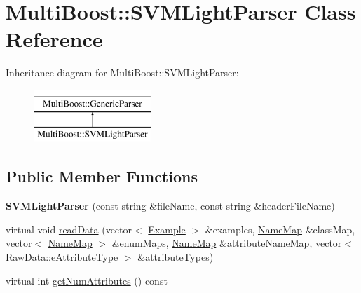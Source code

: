 \hypertarget{classMultiBoost_1_1SVMLightParser}{\section{Multi\-Boost\-:\-:S\-V\-M\-Light\-Parser Class Reference}
\label{classMultiBoost_1_1SVMLightParser}
}
Inheritance diagram for Multi\-Boost\-:\-:S\-V\-M\-Light\-Parser\-:\begin{figure}[H]
\begin{center}
\leavevmode
\includegraphics[height=2.000000cm]{classMultiBoost_1_1SVMLightParser}
\end{center}
\end{figure}
\subsection*{Public Member Functions}
\begin{DoxyCompactItemize}
\item 
\hypertarget{classMultiBoost_1_1SVMLightParser_aaa1fd5596da9a87b18c62e4099159907}{{\bfseries S\-V\-M\-Light\-Parser} (const string \&file\-Name, const string \&header\-File\-Name)}\label{classMultiBoost_1_1SVMLightParser_aaa1fd5596da9a87b18c62e4099159907}

\item 
virtual void \hyperlink{classMultiBoost_1_1SVMLightParser_a447e1de2725f5c00d26d4a174b51c916}{read\-Data} (vector$<$ \hyperlink{classMultiBoost_1_1Example}{Example} $>$ \&examples, \hyperlink{classMultiBoost_1_1NameMap}{Name\-Map} \&class\-Map, vector$<$ \hyperlink{classMultiBoost_1_1NameMap}{Name\-Map} $>$ \&enum\-Maps, \hyperlink{classMultiBoost_1_1NameMap}{Name\-Map} \&attribute\-Name\-Map, vector$<$ Raw\-Data\-::e\-Attribute\-Type $>$ \&attribute\-Types)
\item 
virtual int \hyperlink{classMultiBoost_1_1SVMLightParser_a71e7f44ab883a8e5f5c211d22e29a1d9}{get\-Num\-Attributes} () const 
\end{DoxyCompactItemize}

